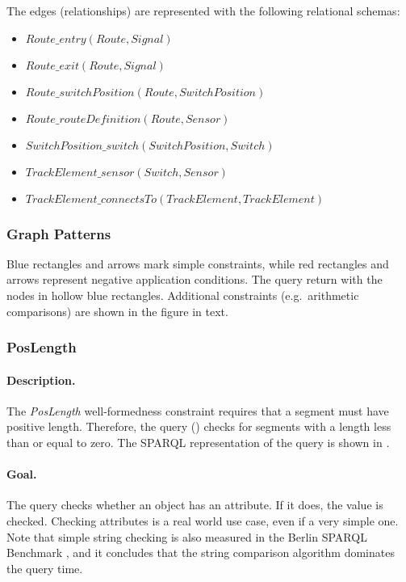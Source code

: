 The edges (relationships) are represented with the following relational schemas:

\begin{itemize}
  \item $ \mathit{Route\_entry}\left(\mathit{Route}, \mathit{Signal}\right) $
  \item $ \mathit{Route\_exit}\left(\mathit{Route}, \mathit{Signal}\right) $
  \item $ \mathit{Route\_switchPosition}\left(\mathit{Route}, \mathit{SwitchPosition}\right) $
  \item $ \mathit{Route\_routeDefinition}\left(\mathit{Route}, \mathit{Sensor}\right) $
  \item $ \mathit{SwitchPosition\_switch}\left(\mathit{SwitchPosition}, \mathit{Switch}\right) $
  \item $ \mathit{TrackElement\_sensor}\left(\mathit{Switch}, \mathit{Sensor}\right) $
  \item $ \mathit{TrackElement\_connectsTo}\left(\mathit{TrackElement}, \mathit{TrackElement}\right) $
\end{itemize}

\subsubsection{Graph Patterns}

Blue rectangles and arrows mark simple constraints, while red rectangles and arrows represent negative application conditions. The query return with the nodes in hollow blue rectangles. Additional constraints (e.g.\ arithmetic comparisons) are shown in the figure in text.

\subsubsection{PosLength}

\paragraph{Description.} The \textit{PosLength} well-formedness constraint requires that a segment must have positive length. Therefore, the query () checks for segments with a length less than or equal to zero. The SPARQL representation of the query is shown in .

\paragraph{Goal.} The query checks whether an object has an attribute. If it does, the value is checked. Checking attributes is a real world use case, even if a very simple one. Note that simple string checking is also measured in the Berlin SPARQL Benchmark \cite{BSBM}, and it concludes that the string comparison algorithm dominates the query time.

